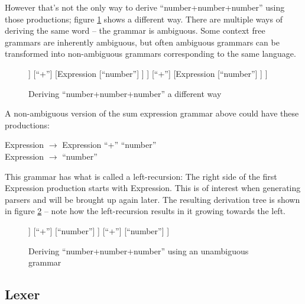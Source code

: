 			However that's not the only way to derive ``number+number+number'' using those productions; figure \ref{fig:derivation_tree_exp_2} shows a different way. There are multiple ways of deriving the same word -- the grammar is ambiguous. Some context free grammars are inherently ambiguous, but often ambiguous grammars can be transformed into non-ambiguous grammars corresponding to the same language.
			
			\begin{figure}
			\centering
			\begin{forest}
			[Expression
				[Expression
					[Expression
						[``number'']
					]
					[``+'']
					[Expression
						[``number'']
					]
				]
				[``+'']
				[Expression
					[``number'']
				]
			]
			\end{forest}
			\caption{Deriving ``number+number+number'' a different way}
			\label{fig:derivation_tree_exp_2}
			\end{figure}
			
			A non-ambiguous version of the sum expression grammar above could have these productions:
			
			Expression $\rightarrow$ Expression ``+'' ``number''\\
			Expression $\rightarrow$ ``number''
			
			This grammar has what is called a left-recursion: The right side of the first Expression production starts with Expression. This is of interest when generating parsers and will be brought up again later. The resulting derivation tree is shown in figure \ref{fig:derivation_tree_exp_3} -- note how the left-recursion results in it growing towards the left.
			
			\begin{figure}
			\centering
			\begin{forest}
			[Expression
				[Expression
					[Expression
						[``number'']
					]
					[``+'']
					[``number'']
				]
				[``+'']
				[``number'']
			]
			\end{forest}
			\caption{Deriving ``number+number+number'' using an unambiguous grammar}
			\label{fig:derivation_tree_exp_3}
			\end{figure}
			
		
		\subsection{Lexer}
		
